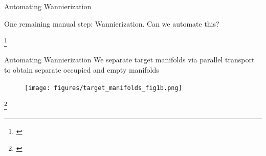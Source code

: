 \documentclass[xcolor=table,aspectratio=169]{beamer}
\newcommand\blfootcite[1]{%
  \begingroup
  \renewcommand\thefootnote{}\footnote{\hspace{-4ex}\cite{#1}}%
  \addtocounter{footnote}{-1}%
  \endgroup
}
\numberwithin{equation}{section}
\begin{document}
\begin{frame}{Automating Wannierization}

   One remaining manual step: Wannierization. Can we automate this?

   \begin{figure}[t]
      \begin{subfigure}{0.2\textwidth}
      \end{subfigure}
      \begin{subfigure}{0.2\textwidth}
      \end{subfigure}
      \hspace{0.025\textwidth}
      \begin{subfigure}{0.2\textwidth}
      \end{subfigure}
   \end{figure}


   \blfootcite{Qiao2023}

\end{frame}

\begin{frame}{Automating Wannierization}
   We separate target manifolds via parallel transport to obtain separate occupied and empty manifolds

      \begin{figure}
         \texttt{[image: figures/target\_manifolds\_fig1b.png]}
      \end{figure}


   \blfootcite{Qiao2023a}

\end{frame}
\end{document}
